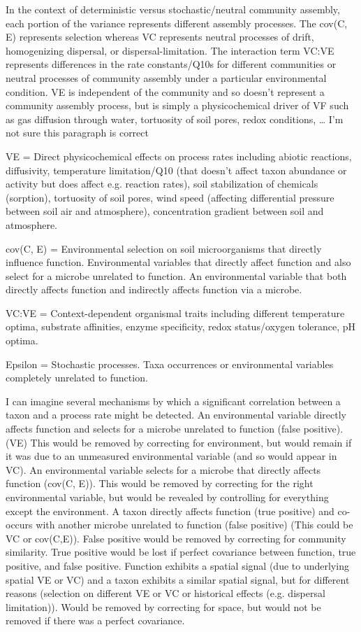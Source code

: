 \documentclass{article}
\begin{document}
In the context of deterministic versus stochastic/neutral community assembly,
each portion of the variance represents different assembly processes. The cov(C,
E) represents selection whereas VC represents neutral processes of drift,
homogenizing dispersal, or dispersal-limitation. The interaction term VC:VE
represents differences in the rate constants/Q10s for different communities or
neutral processes of community assembly under a particular environmental
condition. VE is independent of the community and so doesn’t represent a
community assembly process, but is simply a physicochemical driver of VF such as
gas diffusion through water, tortuosity of soil pores, redox conditions, … I’m
not sure this paragraph is correct

VE = Direct physicochemical effects on process rates including abiotic
reactions, diffusivity, temperature limitation/Q10 (that doesn’t affect taxon
abundance or activity but does affect e.g. reaction rates), soil stabilization
of chemicals (sorption), tortuosity of soil pores, wind speed (affecting
differential pressure between soil air and atmosphere), concentration gradient
between soil and atmosphere.

cov(C, E) = Environmental selection on soil microorganisms that directly
influence function. Environmental variables that directly affect function and
also select for a microbe unrelated to function. An environmental variable that
both directly affects function and indirectly affects function via a microbe. 

VC:VE = Context-dependent organismal traits including different temperature
optima, substrate affinities, enzyme specificity, redox status/oxygen tolerance,
pH optima. 

Epsilon = Stochastic processes. Taxa occurrences or
environmental variables completely unrelated to function.

I can imagine several mechanisms by which a significant correlation between a
taxon and a process rate might be detected.  An environmental variable directly
affects function and selects for a microbe unrelated to function (false
positive). (VE) This would be removed by correcting for environment, but would
remain if it was due to an unmeasured environmental variable (and so would
appear in VC).  An environmental variable selects for a microbe that directly
affects function (cov(C, E)). This would be removed by correcting for the right
environmental variable, but would be revealed by controlling for everything
except the environment.  A taxon directly affects function (true positive)  and
co-occurs with another microbe unrelated to function (false positive) (This
could be VC or cov(C,E)). False positive would be removed by correcting for
community similarity. True positive would be lost if perfect covariance between
function, true positive, and false positive.  Function exhibits a spatial signal
(due to underlying spatial VE or VC) and a taxon exhibits a similar spatial
signal, but for different reasons (selection on different VE or VC or historical
effects (e.g. dispersal limitation)). Would be removed by correcting for space,
but would not be removed if there was a perfect covariance.
\end{document}
